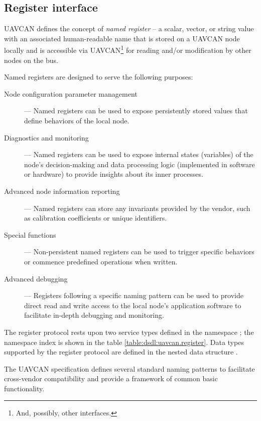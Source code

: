 \subsection{Register interface}\label{sec:application_register_interface}

UAVCAN defines the concept of \emph{named register} -- a scalar, vector, or string value with an associated
human-readable name that is stored on a UAVCAN node locally and is accessible via
UAVCAN\footnote{And, possibly, other interfaces.} for reading and/or modification
by other nodes on the bus.

Named registers are designed to serve the following purposes:
\begin{description}
    \item[Node configuration parameter management] --- Named registers can be used to expose persistently stored
          values that define behaviors of the local node.

    \item[Diagnostics and monitoring] --- Named registers can be used to expose internal states (variables) of
          the node's decision-making and data processing logic (implemented in software or hardware) to provide
          insights about its inner processes.

    \item[Advanced node information reporting] --- Named registers can store any invariants provided by the vendor,
          such as calibration coefficients or unique identifiers.

    \item[Special functions] --- Non-persistent named registers can be used to trigger specific behaviors or
          commence predefined operations when written.

    \item[Advanced debugging] --- Registers following a specific naming pattern can be used to provide direct read
          and write access to the local node's application software to facilitate in-depth debugging and monitoring.
\end{description}

The register protocol rests upon two service types defined in the namespace ;
the namespace index is shown in the table \ref{table:dsdl:uavcan.register}.
Data types supported by the register protocol are defined in the nested data structure
.

The UAVCAN specification defines several standard naming patterns to facilitate cross-vendor compatibility
and provide a framework of common basic functionality.

